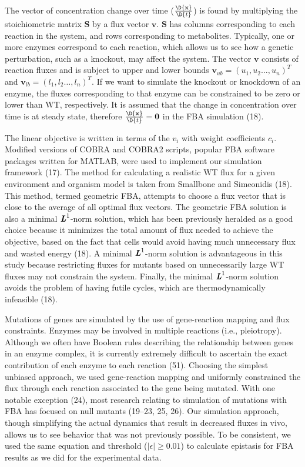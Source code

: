 The vector of concentration change over time
($\frac{\D{\mathbf{x}}}{\D{t}}$) is found by multiplying the
stoichiometric matrix $\mathbf{S}$ by a flux vector
$\mathbf{v}$. $\mathbf{S}$ has columns corresponding to each reaction
in the system, and rows corresponding to metabolites. Typically, one
or more enzymes correspond to each reaction, which allows us to see
how a genetic perturbation, such as a knockout, may affect the
system. The vector $\mathbf{v}$ consists of reaction fluxes and is
subject to upper and lower bounds $\mathbf{v}_{ub} = \left(u_1,u_2
\ldots, u_n\right)^T$ and $\mathbf{v}_{lb} = \left(l_1,l_2 \ldots,
l_n\right)^T$.  If we want to simulate the knockout or knockdown of an
enzyme, the fluxes corresponding to that enzyme can be constrained to
be zero or lower than WT, respectively. It is assumed that the change
in concentration over time is at steady state, therefore
$\frac{\D{\mathbf{x}}}{\D{t}} = \mathbf{0}$ in the FBA simulation
(18).

The linear objective is written in terms of the $v_i$ with weight
coefficients $c_i$. Modified versions of COBRA and COBRA2 scripts,
popular FBA software packages written for MATLAB, were used to
implement our simulation framework (17). The method for calculating a
realistic WT flux for a given environment and organism model is taken
from Smallbone and Simeonidis (18). This method, termed geometric FBA,
attempts to choose a flux vector that is close to the average of all
optimal flux vectors. The geometric FBA solution is also a minimal
$\textbf{\textit{L}}^1$-norm solution, which has been previously
heralded as a good choice because it minimizes the total amount of
flux needed to achieve the objective, based on the fact that cells
would avoid having much unnecessary flux and wasted energy (18). A
minimal $\textbf{\textit{L}}^1$-norm solution is advantageous in this
study because restricting fluxes for mutants based on unnecessarily
large WT fluxes may not constrain the system. Finally, the minimal
$\textbf{\textit{L}}^1$-norm solution avoids the problem of having
futile cycles, which are thermodynamically infeasible (18).

Mutations of genes are simulated by the use of gene-reaction mapping
and flux constraints. Enzymes may be involved in multiple reactions
(i.e., pleiotropy). Although we often have Boolean rules describing
the relationship between genes in an enzyme complex, it is currently
extremely difficult to ascertain the exact contribution of each enzyme
to each reaction (51). Choosing the simplest unbiased approach, we
used gene-reaction mapping and uniformly constrained the flux through
each reaction associated to the gene being mutated. With one notable
exception (24), most research relating to simulation of mutations with
FBA has focused on null mutants (19–23, 25, 26). Our simulation
approach, though simplifying the actual dynamics that result in
decreased fluxes in vivo, allows us to see behavior that was not
previously possible. To be consistent, we used the same equation and
threshold ($\left|\epsilon\right| \geq 0.01$) to calculate epistasis
for FBA results as we did for the experimental data.

